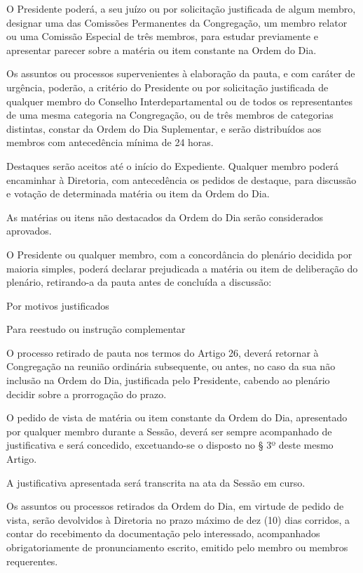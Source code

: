 \documentclass{documento}
\begin{document}
\paragrafo O Presidente poderá, a seu juízo ou por solicitação justificada de algum membro, designar uma das Comissões Permanentes da Congregação, um membro relator ou uma Comissão Especial de três membros, para estudar previamente e apresentar parecer sobre a matéria ou item constante na Ordem do Dia.

\artigo Os assuntos ou processos supervenientes à elaboração da pauta, e com caráter de urgência, poderão, a critério do Presidente ou por solicitação justificada de qualquer membro do Conselho Interdepartamental ou de todos os representantes de uma mesma categoria na Congregação, ou de três membros de categorias distintas, constar da Ordem do Dia Suplementar, e serão distribuídos aos membros com antecedência mínima de 24 horas.

\artigo Destaques serão aceitos até o início do Expediente. Qualquer membro poderá encaminhar à Diretoria, com antecedência os pedidos de destaque, para discussão e votação de determinada matéria ou item da Ordem do Dia.

\paragrafounico As matérias ou itens não destacados da Ordem do Dia serão considerados aprovados.

\artigo O Presidente ou qualquer membro, com a concordância do plenário decidida por maioria simples, poderá declarar prejudicada a matéria ou item de deliberação do plenário, retirando-a da pauta antes de concluída a discussão:

\inciso Por motivos justificados

\inciso Para reestudo ou instrução complementar

\paragrafounico O processo retirado de pauta nos termos do Artigo 26, deverá retornar à Congregação na reunião ordinária subsequente, ou antes, no caso da sua não inclusão na Ordem do Dia, justificada pelo Presidente, cabendo ao plenário decidir sobre a prorrogação do prazo.


\artigo O pedido de vista de matéria ou item constante da Ordem do Dia, apresentado por qualquer membro durante a Sessão, deverá ser sempre acompanhado de justificativa e será concedido, excetuando-se o disposto no § 3º deste mesmo Artigo.

\paragrafo A justificativa apresentada será transcrita na ata da Sessão em curso.

\paragrafo Os assuntos ou processos retirados da Ordem do Dia, em virtude de pedido de vista, serão devolvidos à Diretoria no prazo máximo de dez (10) dias corridos, a contar do recebimento da documentação pelo interessado, acompanhados obrigatoriamente de pronunciamento escrito, emitido pelo membro ou membros requerentes.
\end{document}
